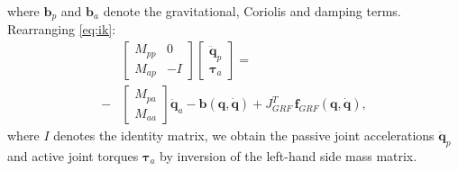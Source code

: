 \documentclass[letterpaper, 10 pt, conference]{ieeeconf}  %
\begin{document}
where $\mathbf{b}_p$ and $\mathbf{b}_a$ denote the gravitational, Coriolis and damping terms. 
Rearranging \eqref{eq:ik}:
\begin{equation}
	\begin{aligned}
		&\left[\begin{array}{cc}  
			M_{pp} & 0\\
			M_{ap} &-I
		\end{array} \right]
		\left[\begin{array}{c}  
			\mathbf{\ddot q}_p\\
			\boldsymbol{\tau}_a
		\end{array} \right] =\\ 
		-&
		\left[\begin{array}{c}  
			M_{pa}\\
			M_{aa}
		\end{array} \right] 
		\mathbf{\ddot q}_a-
		\mathbf{b(q, \dot q)}+
		J_{GRF}^T \, \mathbf{f}_{GRF} \left( \mathbf{q, \dot q} \right),
	\end{aligned}
\end{equation}	
where $I$ denotes the identity matrix, we obtain the passive joint accelerations $\mathbf{\ddot q}_p$ and active joint torques $\boldsymbol{\tau}_a$ by inversion of the left-hand side mass matrix.
\end{document}
